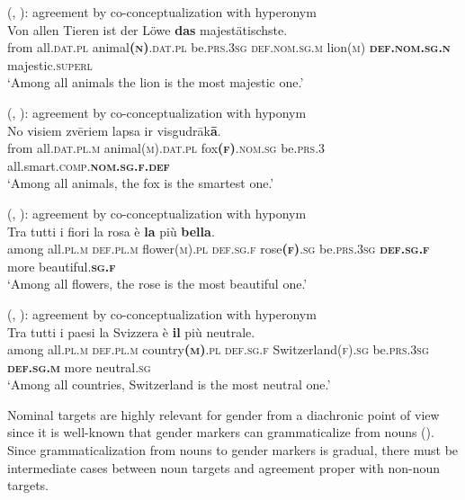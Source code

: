 \documentclass[output=collectionpaper]{langsci/langscibook}
\begin{document}
\ea\label{ex:WDG:66}
 (, ): agreement by co-conceptualization with hyperonym\\
\gll Von	allen	Tieren	ist	der	Löwe	\textbf{das} majestätischste.\\
from	all.\textsc{dat.pl}	animal\textsc{\textbf{(n)}.dat.pl}	be.\textsc{prs.3sg}	\textsc{def.nom.sg.m}	lion(\textsc{m})	\textbf{\textsc{def.nom.sg.n}} majestic.\textsc{superl}\\
\glt `Among all animals the lion is the most majestic one.'\\
\z

\ea\label{ex:WDG:67}
 (, ): agreement by co-conceptualization with hyponym\\
\gll No	visiem	zvēriem	lapsa	ir	visgudrāk\textbf{ā}.\\
from	all.\textsc{dat.pl.m}	animal\textsc{(m).dat.pl}	fox\textsc{\textbf{(f)}.nom.sg}	be.\textsc{prs.3}	all.smart.\textsc{comp.\textbf{nom.sg.f.def}}\\
\glt `Among all animals, the fox is the smartest one.'\\
\z

\ea\label{ex:WDG:68}
 (, ): agreement by co-conceptualization with hyponym\\
\gll Tra	tutti	i	fiori	la	rosa	è	\textbf{la}	più	\textbf{bella}.\\
among	all.\textsc{pl.m}	\textsc{def.pl.m}	flower\textsc{(m).pl}	\textsc{def.sg.f}	rose\textsc{\textbf{(f)}.sg}	be.\textsc{prs.3sg}	\textbf{\textsc{def.sg.f}}	more	beautiful.\textbf{\textsc{sg.f}}\\
\glt `Among all flowers, the rose is the most beautiful one.'\\
\z

\ea\label{ex:WDG:69}
 (, ): agreement by co-conceptualization with hyperonym\\
\gll Tra	tutti	i	paesi	la	Svizzera	è	\textbf{il}	più	neutrale.\\
among	all.\textsc{pl.m}	\textsc{def.pl.m}	country\textsc{\textbf{(m)}.pl}	\textsc{def.sg.f}	Switzerland\textsc{(f).sg}	be.\textsc{prs.3sg}	\textbf{\textsc{def.sg.m}}	more	neutral.\textsc{sg}\\
\glt `Among all countries, Switzerland is the most neutral one.'\\
 \z

 Nominal targets are highly relevant for gender from a diachronic point of view since it is well-known that gender markers can grammaticalize from nouns (\citealt[225]{Heine1984}). Since grammaticalization from nouns to gender markers is gradual, there must be intermediate cases between noun targets and agreement proper with non-noun targets.
\end{document}
